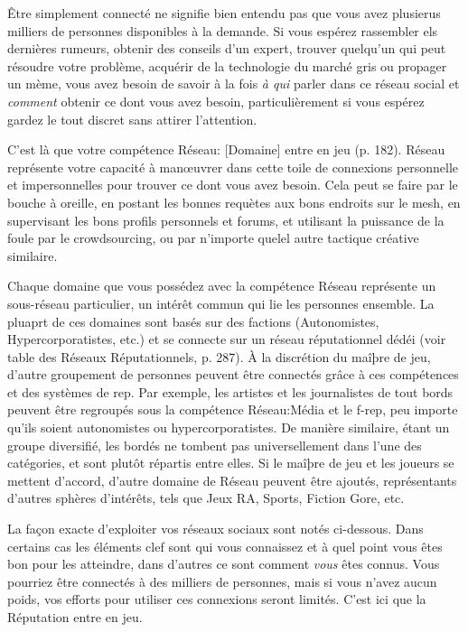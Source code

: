 Être simplement connecté ne signifie bien entendu pas que vous avez plusierus milliers de personnes disponibles à la demande. Si vous espérez rassembler els dernières rumeurs, obtenir des conseils d'un expert, trouver quelqu'un qui peut résoudre votre problème, acquérir de la technologie du marché gris ou propager un mème, vous avez besoin de savoir à la fois \textit{à qui} parler dans ce réseau social et \textit{comment} obtenir ce dont vous avez besoin, particulièrement si vous espérez gardez le tout discret sans attirer l'attention. 

C'est là que votre compétence Réseau: [Domaine] entre en jeu (p. 182). Réseau représente votre capacité à manœuvrer dans cette toile de connexions personnelle et impersonnelles pour trouver ce dont vous avez besoin. Cela peut se faire par le bouche à oreille, en postant les bonnes requètes aux bons endroits sur le mesh, en supervisant les bons profils personnels et forums, et utilisant la puissance de la foule par le crowdsourcing, ou par n'importe quelel autre tactique créative similaire. 

Chaque domaine que vous possédez avec la compétence Réseau représente un sous-réseau particulier, un intérêt commun qui lie les personnes ensemble. La pluaprt de ces domaines sont basés sur des factions (Autonomistes, Hypercorporatistes, etc.) et se connecte sur un réseau réputationnel dédéi (voir table des Réseaux Réputationnels, p. 287). À la discrétion du maîþre de jeu, d'autre groupement de personnes peuvent être connectés grâce à ces compétences et des systèmes de rep. Par exemple, les artistes et les journalistes de tout bords peuvent être regroupés sous la compétence Réseau:Média et le f-rep, peu importe qu'ils soient autonomistes ou hypercorporatistes. De manière similaire, étant un groupe diversifié, les bordés ne tombent pas universellement dans l'une des catégories, et sont plutôt répartis entre elles. Si le maîþre de jeu et les joueurs se mettent d'accord, d'autre domaine de Réseau peuvent être ajoutés, représentants d'autres sphères d'intérêts, tels que Jeux RA, Sports, Fiction Gore, etc. 

La façon exacte d'exploiter vos réseaux sociaux sont notés ci-dessous. Dans certains cas les éléments clef sont qui vous connaissez et à quel point vous êtes bon pour les atteindre, dans d'autres ce sont comment \textit{vous} êtes connus. Vous pourriez être connectés à des milliers de personnes, mais si vous n'avez aucun poids, vos efforts pour utiliser ces connexions seront limités. C'est ici que la Réputation entre en jeu. 

